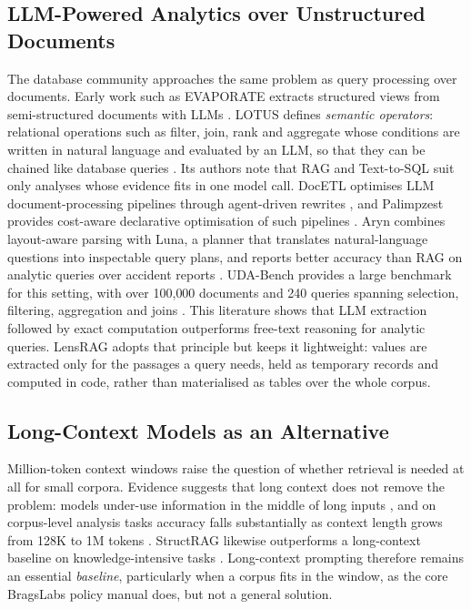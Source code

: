 \documentclass[11pt,letterpaper,oneside]{report}
\begin{document}
\subsection{LLM-Powered Analytics over Unstructured Documents}
The database community approaches the same problem as query processing over
documents. Early work such as EVAPORATE extracts structured views from
semi-structured documents with LLMs \citep{arora2023evaporate}. LOTUS
defines \emph{semantic operators}: relational operations such as filter,
join, rank and aggregate whose conditions are written in natural language and
evaluated by an LLM, so that they can be chained like database queries
\citep{patel2025lotus}. Its authors note that RAG and Text-to-SQL suit only
analyses whose evidence fits in one model call. DocETL optimises LLM document-processing
pipelines through agent-driven rewrites \citep{shankar2025docetl}, and
Palimpzest provides cost-aware declarative optimisation of such pipelines
\citep{liu2025palimpzest}. Aryn combines layout-aware parsing with Luna, a
planner that translates natural-language questions into inspectable query
plans, and reports better accuracy than RAG on analytic queries over
accident reports \citep{anderson2025aryn}. UDA-Bench provides a large
benchmark for this setting, with over 100{,}000 documents and 240 queries
spanning selection, filtering, aggregation and joins
\citep{deng2026udabench}. This literature shows that LLM extraction followed
by exact computation outperforms free-text reasoning for analytic queries.
LensRAG adopts that principle but keeps it lightweight: values are extracted
only for the passages a query needs, held as temporary records and computed
in code, rather than materialised as tables over the whole corpus.

\subsection{Long-Context Models as an Alternative}
Million-token context windows raise the question of whether retrieval is
needed at all for small corpora. Evidence suggests that long context does not
remove the problem: models under-use information in the middle of long
inputs \citep{liu2024lostmiddle}, and on corpus-level analysis tasks
accuracy falls substantially as context length grows from 128K to 1M tokens
\citep{lu2026corpusqa}. StructRAG likewise outperforms a long-context
baseline on knowledge-intensive tasks \citep{li2025structrag}. Long-context
prompting therefore remains an essential \emph{baseline}, particularly when a
corpus fits in the window, as the core BragsLabs policy manual does, but not a
general solution.
\end{document}
